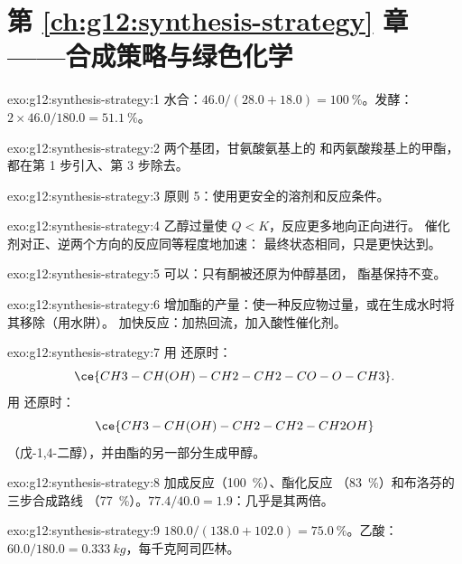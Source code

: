 \section*{第 \ref{ch:g12:synthesis-strategy} 章——合成策略与绿色化学}

\begin{solution}{exo:g12:synthesis-strategy:1}
水合：$46.0/(28.0 + 18.0) = \qty{100}{\percent}$。发酵：
$2 \times 46.0/180.0 = \qty{51.1}{\percent}$。
\end{solution}

\begin{solution}{exo:g12:synthesis-strategy:2}
两个基团，甘氨酸氨基上的  和丙氨酸羧基上的甲酯，
都在第 1 步引入、第 3 步除去。
\end{solution}

\begin{solution}{exo:g12:synthesis-strategy:3}
原则 5：使用更安全的溶剂和反应条件。
\end{solution}

\begin{solution}{exo:g12:synthesis-strategy:4}
乙醇过量使 $Q < K$，反应更多地向正向进行。
催化剂对正、逆两个方向的反应同等程度地加速：
最终状态相同，只是更快达到。
\end{solution}

\begin{solution}{exo:g12:synthesis-strategy:5}
可以：只有酮被还原为仲醇基团，
酯基保持不变。
\end{solution}

\begin{solution}{exo:g12:synthesis-strategy:6}
增加酯的产量：使一种反应物过量，或在生成水时将其移除（用水阱）。
加快反应：加热回流，加入酸性催化剂。
\end{solution}

\begin{solution}{exo:g12:synthesis-strategy:7}
用  还原时：
\[ \ce{CH3-CH(OH)-CH2-CH2-CO-O-CH3} . \]
用  还原时：
\[ \ce{CH3-CH(OH)-CH2-CH2-CH2OH} \]
（戊-1,4-二醇），并由酯的另一部分生成甲醇。
\end{solution}

\begin{solution}{exo:g12:synthesis-strategy:8}
加成反应（\qty{100}{\percent}）、酯化反应
（\qty{83}{\percent}）和布洛芬的三步合成路线
（\qty{77}{\percent}）。$77.4/40.0 = 1.9$：几乎是其两倍。
\end{solution}

\begin{solution}{exo:g12:synthesis-strategy:9}
$180.0/(138.0 + 102.0) = \qty{75.0}{\percent}$。乙酸：
$60.0/180.0 = \qty{0.333}{kg}$，每千克阿司匹林。
\end{solution}

